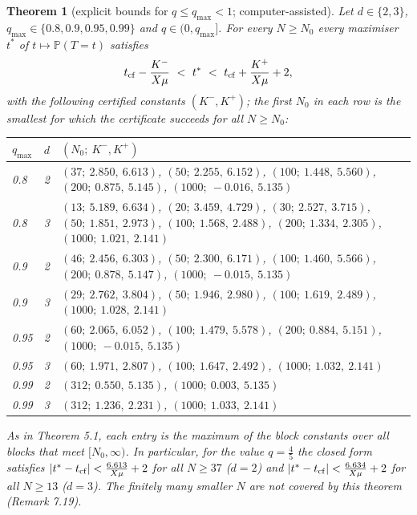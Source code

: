 \documentclass[11pt,a4paper]{article}
\newtheorem{theorem}{Theorem}[section]
\theoremstyle{definition}
\theoremstyle{remark}
\begin{document}
\begin{theorem}[{explicit bounds for $q\le q_{\max}<1$; computer-assisted}]
Let $d\in\{2,3\}$, $q_{\max}\in\{0.8,0.9,0.95,0.99\}$ and $q\in(0,q_{\max}]$. For every $N\ge N_0$ every maximiser $t^*$ of $t\mapsto\mathbb P(T=t)$ satisfies
\begin{equation*}
t_{\rm cf}-\frac{K^-}{X\mu}\ <\ t^*\ <\ t_{\rm cf}+\frac{K^+}{X\mu}+2,
\end{equation*}
with the following certified constants $(K^-,K^+)$; the first $N_0$ in each row is the smallest for which the certificate succeeds for all $N\ge N_0$:

\begin{center}\small
\begin{tabular}{ll>{\raggedright\arraybackslash}p{12.5cm}}
\toprule
$q_{\max}$ & $d$ & $(N_0;\ K^-,K^+)$ \\ \midrule
0.8 & 2 & $(37;\ 2.850,\ 6.613)$, $(50;\ 2.255,\ 6.152)$, $(100;\ 1.448,\ 5.560)$, $(200;\ 0.875,\ 5.145)$, $(1000;\ -0.016,\ 5.135)$ \\
0.8 & 3 & $(13;\ 5.189,\ 6.634)$, $(20;\ 3.459,\ 4.729)$, $(30;\ 2.527,\ 3.715)$, $(50;\ 1.851,\ 2.973)$, $(100;\ 1.568,\ 2.488)$, $(200;\ 1.334,\ 2.305)$, $(1000;\ 1.021,\ 2.141)$ \\
0.9 & 2 & $(46;\ 2.456,\ 6.303)$, $(50;\ 2.300,\ 6.171)$, $(100;\ 1.460,\ 5.566)$, $(200;\ 0.878,\ 5.147)$, $(1000;\ -0.015,\ 5.135)$ \\
0.9 & 3 & $(29;\ 2.762,\ 3.804)$, $(50;\ 1.946,\ 2.980)$, $(100;\ 1.619,\ 2.489)$, $(1000;\ 1.028,\ 2.141)$ \\
0.95 & 2 & $(60;\ 2.065,\ 6.052)$, $(100;\ 1.479,\ 5.578)$, $(200;\ 0.884,\ 5.151)$, $(1000;\ -0.015,\ 5.135)$ \\
0.95 & 3 & $(60;\ 1.971,\ 2.807)$, $(100;\ 1.647,\ 2.492)$, $(1000;\ 1.032,\ 2.141)$ \\
0.99 & 2 & $(312;\ 0.550,\ 5.135)$, $(1000;\ 0.003,\ 5.135)$ \\
0.99 & 3 & $(312;\ 1.236,\ 2.231)$, $(1000;\ 1.033,\ 2.141)$ \\
\bottomrule
\end{tabular}
\end{center}

As in Theorem 5.1, each entry is the maximum of the block constants over all blocks that meet $[N_0,\infty)$. In particular, for the value $q=\frac45$ the closed form satisfies $|t^*-t_{\rm cf}|<\frac{6.613}{X\mu}+2$ for all $N\ge37$ ($d=2$) and $|t^*-t_{\rm cf}|<\frac{6.634}{X\mu}+2$ for all $N\ge13$ ($d=3$). The finitely many smaller $N$ are not covered by this theorem (Remark 7.19).
\end{theorem}
\end{document}
